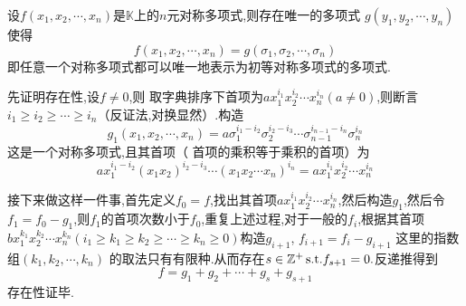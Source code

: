 \begin{formal}
\begin{theorem}[对称多项式基本定理]\label{thm:对称多项式基本定理}
    设$f\left(
        x_1,x_2,\cdots,x_n
    \right)$是$\mathbb{K}$上的$n$元对称多项式,则存在唯一的多项式
    $g\left(
        y_1,y_2,\cdots,y_n
    \right)$使得
    \[
    f\left(
        x_1,x_2,\cdots,x_n
    \right)=g\left(
        \sigma_1,\sigma_2,\cdots,\sigma_n
    \right)
    \]即任意一个对称多项式都可以唯一地表示为初等对称多项式的多项式.
\end{theorem}
\begin{Proof}
先证明存在性,设$f\neq 0$,则
取字典排序下首项为$ax_1^{i_1}x_2^{i_2}\cdots x_n^{i_n}\left(
    a\neq 0
\right)$,则断言$
i_1\geqslant i_2\geqslant\cdots\geqslant i_n
$（反证法,对换显然）.构造
\[
g_1\left(
    x_1,x_2,\cdots,x_n
\right)=
a\sigma_1^{i_1-i_2}\sigma_2^{i_2-i_3}\cdots\sigma_{n-1}^{i_{n-1}-i_n}\sigma_n^{i_n}
\]这是一个对称多项式,且其首项（
首项的乘积等于乘积的首项）为\[
ax_1^{i_1-i_2}\left(
    x_1x_2
\right)^{i_2-i_3}\cdots\left(
    x_1x_2\cdots x_n\right)^{i_n}=ax_1^{i_1}x_2^{i_2}\cdots x_n^{i_n}
\]

接下来做这样一件事,首先定义$f_0=f$,找出其首项$a
 x_1^{i_1}x_2^{i_2}\cdots x_n^{i_n}$,然后构造$g_1$,然后令$f_1=f_0-g_1$,则$f_1$的首项次数小于$f_0$,重复上述过程,对于一般的$f_i$,根据其首项
 $bx_1^{k_1} 
    x_2^{k_2}\cdots x_n^{k_n}\left(
        i_1\geqslant k_1\geqslant k_2\geqslant\cdots\geqslant k_n\geqslant 0
    \right)$构造$g_{i+1}$,
    $f_ {i+1}=f_i-g_{i+1}
     $
    这里的指数组$
    \left(
        k_1,k_2,\cdots,k_n
    \right)
    $
    的取法只有有限种.从而存在$s\in\mathbb{Z}^+\,\textup{s.t.}f_{s+1}=0.$反递推得到
    \[
    f=g_1+g_2+\cdots+g_s+g_{s+1}
    \]存在性证毕.


\end{Proof}
\end{formal}
